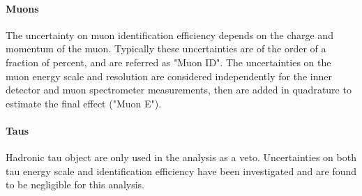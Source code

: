 \paragraph{Muons}
The uncertainty on muon identification efficiency depends on the charge and momentum of the muon.
Typically these uncertainties are of the order of a fraction of percent, and are referred as "Muon ID". 
The uncertainties on the muon energy scale and resolution are considered independently for the inner detector 
and muon spectrometer measurements, then are added in quadrature to estimate the final effect ("Muon E").

\paragraph{Taus}
Hadronic tau object are only used in the analysis as a veto. Uncertainties on both tau energy scale 
and identification efficiency have been investigated and are found to be negligible for this analysis.

